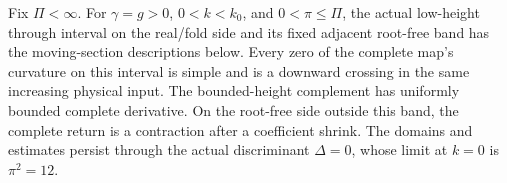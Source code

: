 

\begin{proposition}
\label{deg:prop-positive-quadratic}
Fix \(\Pi<\infty\). For \(\gamma=g>0\),
\(0<k<k_0\), and \(0<\pi\le\Pi\), the actual low-height through
interval on the real/fold side and its fixed adjacent root-free band
has the moving-section descriptions below. Every zero of the complete
map's curvature on this interval is simple and is a downward crossing
in the same increasing physical input. The bounded-height complement
has uniformly bounded complete derivative. On the root-free side
outside this band, the complete return is a contraction after a
coefficient shrink.
The domains and estimates persist through the actual discriminant
\(\Delta=0\), whose limit at \(k=0\) is \(\pi^2=12\).
\end{proposition}

